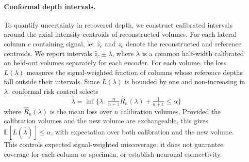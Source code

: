 \paragraph{Conformal depth intervals.} To quantify uncertainty in recovered depth, we construct calibrated intervals around the axial intensity centroids of reconstructed volumes. For each lateral column $c$ containing signal, let $\hat z_c$ and $z_c$ denote the reconstructed and reference centroids. We report intervals $\hat z_c\pm\lambda$, where $\lambda$ is a common half-width calibrated on held-out volumes separately for each encoder. For each volume, the loss $L(\lambda)$ measures the signal-weighted fraction of columns whose reference depths fall outside their intervals. Since $L(\lambda)$ is bounded by one and non-increasing in $\lambda$, conformal risk control \cite{angelopoulos2024crc} selects
\begin{equation}
\hat\lambda=\inf\Big\{\lambda:\ \tfrac{n}{n+1}\hat R_n(\lambda)+\tfrac{1}{n+1}\le\alpha\Big\}
\label{eq:crc}
\end{equation}
where $\hat R_n(\lambda)$ is the mean loss over $n$ calibration volumes. Provided the calibration volumes and the new volume are exchangeable, this gives $\mathbb E[L(\hat\lambda)]\le\alpha$, with expectation over both calibration and the new volume. This controls expected signal-weighted miscoverage; it does not guarantee coverage for each column or specimen, or establish neuronal connectivity.

